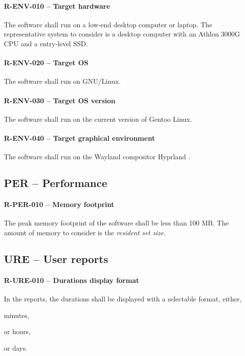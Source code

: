 \paragraph{R-ENV-010 -- Target hardware}
The software shall run on a low-end desktop computer or laptop.
The representative system to consider is a desktop computer with
an Athlon 3000G CPU and a entry-level SSD.

\paragraph{R-ENV-020 -- Target OS}
The software shall run on GNU/Linux.

\paragraph{R-ENV-030 -- Target OS version}
The software shall run on the current version of Gentoo Linux.

\paragraph{R-ENV-040 -- Target graphical environment}
The software shall run on the Wayland compositor Hyprland \cite{hyprland}.

\subsection{PER -- Performance}
\paragraph{R-PER-010 -- Memory footprint}
The peak memory footprint of the software shall be less than 100 MB.
The amount of memory to consider is the \emph{resident set size}.

\subsection{URE -- User reports}
\paragraph{R-URE-010 -- Durations display format}
In the reports, the durations shall be displayed with a selectable format,
either,
\begin{compactitem}
  \item minutes,
  \item or hours,
  \item or days.
\end{compactitem}

